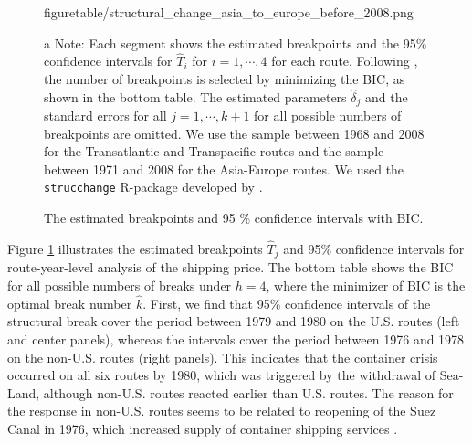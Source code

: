 \documentclass[11pt]{article}
\begin{document}
\begin{figure}[!ht]
\begin{minipage}[b]{0.3\linewidth}
  {figuretable/structural_change_asia_to_europe_before_2008.png}
  \end{minipage}
  {\scriptsize{}
  
\caption{The estimated breakpoints and 95 \% confidence intervals with BIC.}
\label{fg:structural_change_transatlantic_eastbound_before_2008}
\begin{tablenotes}
\item[a]Note: Each segment shows the estimated breakpoints and the 95\% confidence intervals for $\hat{T}_i$ for $i=1,\cdots,4$ for each route. Following \cite{bai2003computation}, the number of breakpoints is selected by minimizing the BIC, as shown in the bottom table. The estimated parameters $\hat{\delta}_j$ and the standard errors for all $j=1,\cdots,k+1$ for all possible numbers of breakpoints are omitted. We use the sample between 1968 and 2008 for the Transatlantic and Transpacific routes and the sample between 1971 and 2008 for the Asia-Europe routes. We used the \texttt{strucchange} R-package developed by \cite{zeileis2002strucchange}.
   \end{tablenotes}
   }
\end{figure}

Figure \ref{fg:structural_change_transatlantic_eastbound_before_2008} illustrates the estimated breakpoints $\hat{T}_j$ and 95\% confidence intervals for route-year-level analysis of the shipping price. The bottom table shows the BIC for all possible numbers of breaks under $h=4$, where the minimizer of BIC is the optimal break number $\hat{k}$. First, we find that 95\% confidence intervals of the structural break cover the period between 1979 and 1980 on the U.S. routes (left and center panels), whereas the intervals cover the period between 1976 and 1978 on the non-U.S. routes (right panels). This indicates that the container crisis occurred on all six routes by 1980, which was triggered by the withdrawal of Sea-Land, although non-U.S. routes reacted earlier than U.S. routes. The reason for the response in non-U.S. routes seems to be related to reopening of the Suez Canal in 1976, which increased supply of container shipping services \citep{jsme2022}.
\end{document}
